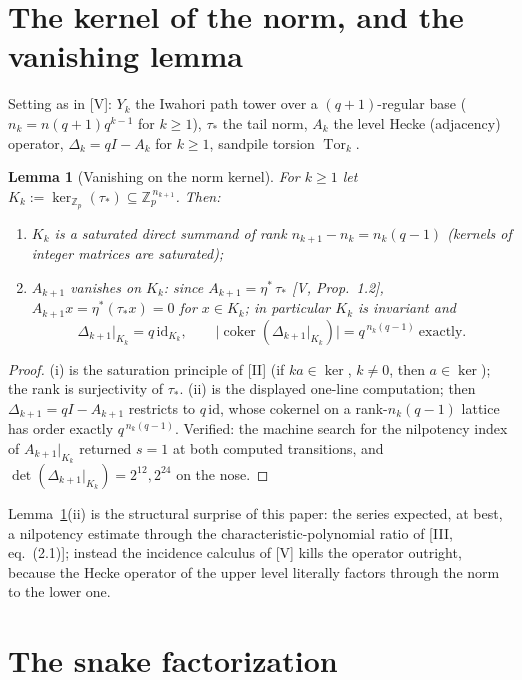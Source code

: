 \documentclass[11pt]{amsart}
\numberwithin{equation}{section}
\newtheorem{lemma}[theorem]{Lemma}
\theoremstyle{definition}
\theoremstyle{remark}
\newcommand{\Z}{\mathbb{Z}}
\newcommand{\Zp}{\Z_p}
\newcommand{\Tor}{\operatorname{Tor}}
\newcommand{\coker}{\operatorname{coker}}
\newcommand{\ta}{\tau_*}
\newcommand{\etp}{\eta^*}
\begin{document}
\section{The kernel of the norm, and the vanishing lemma}\label{sec:kernel}

Setting as in [V]: $Y_k$ the Iwahori path tower over a $(q+1)$-regular base
($n_k=n(q+1)q^{k-1}$ for $k\ge1$), $\ta$ the tail norm, $A_k$ the level Hecke
(adjacency) operator, $\Delta_k=qI-A_k$ for $k\ge1$, sandpile torsion
$\Tor_k$.

\begin{lemma}[Vanishing on the norm kernel]\label{lem:vanish}
For $k\ge1$ let $K_k:=\ker_{\Zp}(\ta)\subseteq\Zp^{\,n_{k+1}}$. Then:
\begin{enumerate}
\item[(i)] $K_k$ is a saturated direct summand of rank $n_{k+1}-n_k=n_k(q-1)$
(kernels of integer matrices are saturated);
\item[(ii)] $A_{k+1}$ vanishes on $K_k$: since $A_{k+1}=\etp\,\ta$
{\rm[V, Prop.~1.2]}, $A_{k+1}x=\etp(\ta x)=0$ for $x\in K_k$; in particular $K_k$
is invariant and
\[
\Delta_{k+1}\big|_{K_k}=q\,\mathrm{id}_{K_k},
\qquad
\bigl|\coker(\Delta_{k+1}|_{K_k})\bigr|=q^{\,n_k(q-1)}\ \text{exactly.}
\]
\end{enumerate}
\end{lemma}

\begin{proof}
(i) is the saturation principle of [II] (if $ka\in\ker$, $k\neq0$, then
$a\in\ker$); the rank is surjectivity of $\ta$. (ii) is the displayed one-line
computation; then $\Delta_{k+1}=qI-A_{k+1}$ restricts to $q\,\mathrm{id}$, whose
cokernel on a rank-$n_k(q-1)$ lattice has order exactly $q^{\,n_k(q-1)}$. Verified:
the machine search for the nilpotency index of $A_{k+1}|_{K_k}$ returned $s=1$ at
both computed transitions, and $\det(\Delta_{k+1}|_{K_k})=2^{12},2^{24}$ on the
nose.
\end{proof}

Lemma~\ref{lem:vanish}(ii) is the structural surprise of this paper: the series
expected, at best, a nilpotency estimate through the characteristic-polynomial ratio
of [III, eq.~(2.1)]; instead the incidence calculus of [V] kills the operator
outright, because the Hecke operator of the upper level literally factors through
the norm to the lower one.

\section{The snake factorization}\label{sec:snake}
\end{document}
